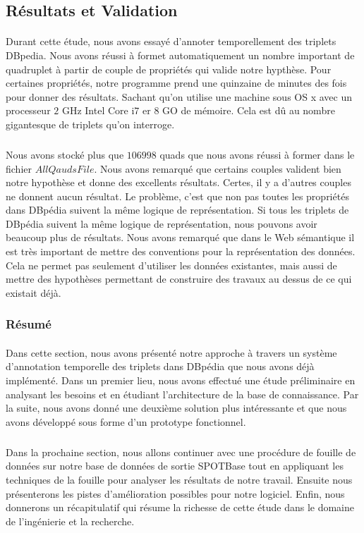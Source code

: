 \documentclass[12pt,a4	]{report}
\begin{document}
\subsection*{Résultats et Validation}
\paragraph{}
Durant cette étude, nous avons essayé d'annoter temporellement des triplets DBpedia. Nous avons réussi à formet automatiquement un nombre important de quadruplet à partir de couple de propriétés qui valide notre hypthèse. Pour certaines propriétés, notre programme prend une quinzaine de minutes des fois pour donner des résultats. Sachant qu'on utilise une machine sous OS x avec un processeur $2$ GHz Intel Core i$7$ er $8$ GO de mémoire. Cela est dû au nombre gigantesque de triplets qu'on interroge.
\subparagraph{}
Nous avons stocké plus que $106998$ quads que nous avons réussi à former dans le fichier $AllQaudsFile$. Nous avons remarqué que certains couples valident bien notre hypothèse et donne des excellents résultats. Certes, il y a d'autres couples ne donnent aucun résultat. Le problème, c'est que non pas toutes les propriétés dans DBpédia suivent la même logique de représentation. Si tous les triplets de DBpédia suivent la même logique de représentation, nous pouvons avoir beaucoup plus de résultats.
Nous avons remarqué que dans le Web sémantique il est très important de mettre des conventions pour la représentation des données. Cela ne permet pas seulement d'utiliser les données existantes, mais aussi de mettre des hypothèses permettant de construire des travaux au dessus de ce qui existait déjà.
\subsubsection*{Résumé}
\paragraph{}
Dans cette section, nous avons présenté notre approche à travers un système d'annotation temporelle des triplets dans DBpédia que nous avons déjà implémenté. Dans un premier lieu, nous avons effectué une étude préliminaire en analysant les besoins et en étudiant l'architecture de la base de connaissance.
Par la suite, nous avons donné une deuxième solution plus intéressante et que nous avons développé  sous forme d'un prototype fonctionnel.
\subparagraph{}
Dans la prochaine section, nous allons continuer avec une procédure de fouille de données sur notre base de données de sortie SPOTBase tout en appliquant les techniques de la fouille pour analyser les résultats de notre travail. Ensuite nous présenterons les pistes d'amélioration possibles pour notre logiciel. Enfin, nous donnerons un récapitulatif qui résume la richesse de cette étude dans le domaine de l'ingénierie et la recherche.

\end{document}
